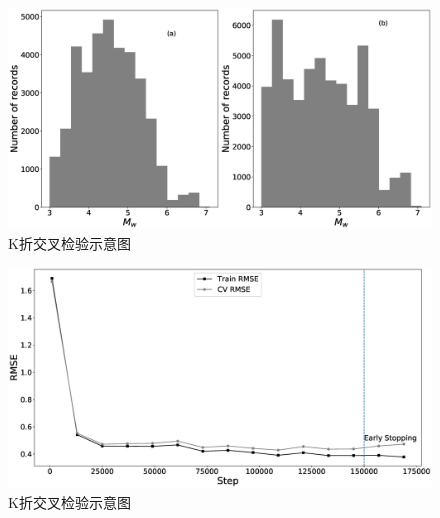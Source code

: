  \begin{figure}[ht]
  \centering
  \includegraphics[width=\linewidth]{img/5event_distribution.eps}
  \caption{K折交叉检验示意图}\label{fig:yinglimoxin}
\end{figure}

 \begin{figure}[ht]
  \centering
  \includegraphics[width=\linewidth]{img/6.eps}
  \caption{K折交叉检验示意图}\label{fig:yinglimoxin}
\end{figure}



